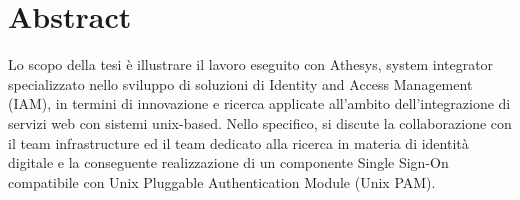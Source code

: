 
\cleardoublepage
{}
{}
\begingroup
\let\clearpage\relax
\let\cleardoublepage\relax
\let\cleardoublepage\relax

\chapter*{Abstract}

Lo scopo della tesi è illustrare il lavoro eseguito con Athesys, system integrator specializzato nello sviluppo di soluzioni di Identity and Access Management (IAM), in termini di innovazione e ricerca applicate all'ambito dell'integrazione di servizi web con sistemi unix-based. Nello specifico, si discute la collaborazione con il team infrastructure ed il team dedicato alla ricerca in materia di identità digitale e la conseguente realizzazione di un componente Single Sign-On compatibile con Unix Pluggable Authentication Module (Unix PAM). ​

%
%

\endgroup			

\vfill

